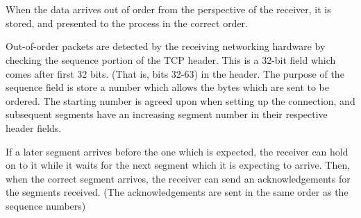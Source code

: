 \section{}
When the data arrives out of order from the perspective of the receiver, it is
stored, and presented to the process in the correct order. 

Out-of-order packets are detected by the receiving networking hardware by
checking the sequence portion of the TCP header. This is a 32-bit field which
comes after first 32 bits. (That is, bits 32-63) in the header.
The purpose of the sequence field is store a number which allows the
bytes which are sent to be ordered. The starting number is agreed upon
when setting up the connection, and subsequent segments have an increasing
segment number in their respective header fields. 

If a later
segment arrives before the one which is expected, the receiver can hold on to it
while it waits for the next segment which it is expecting to arrive. Then, when
the correct segment arrives, the receiver can send an acknowledgements for the
segments received. (The acknowledgements are sent in the same order as the
sequence numbers)
